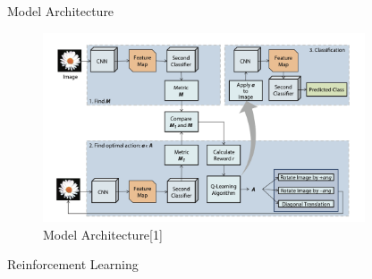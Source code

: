 \documentclass[14pt]{beamer}
\begin{document}
\begin{frame}{Model Architecture}
    \begin{figure}
        \centering
        \includegraphics[width=0.85\textwidth]{model.png}
        \caption{Model Architecture[1]}
    \end{figure}
\end{frame}
\begin{frame}{Reinforcement Learning}
\end{frame}
\end{document}

